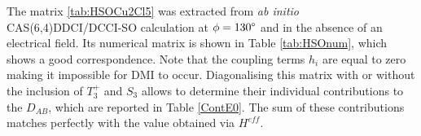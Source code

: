 \documentclass[12pt]{report}
\numberwithin{equation}{section}
\begin{document}
\begin{table}[!ht]
    \centering
\caption{Numerical matrix of $\hat{H}^{SO}$ and electronic couplings in the uncoupled basis from a CAS(6,4)DDCI/DDCI-SO calculation with no electric field and $\phi=130\degree$.}
\label{tab:HSOnum}
\end{table}
The matrix \ref{tab:HSOCu2Cl5} was extracted from \textit{ab initio} CAS(6,4)DDCI/DCCI-SO calculation at $\phi=130\degree$ and in the absence of an electrical field. Its numerical matrix is shown in Table \ref{tab:HSOnum}, which shows a good correspondence. 
Note that the coupling terms $h_i$ are equal to zero making it impossible for DMI to occur.
Diagonalising this matrix with or without the inclusion of $T_3^+$ and $S_3$ allows to determine their individual contributions to the $D_{AB}$, which are reported in Table \ref{ContE0}.
The sum of these contributions matches perfectly with the value obtained via $H^{eff}$.
\end{document}
